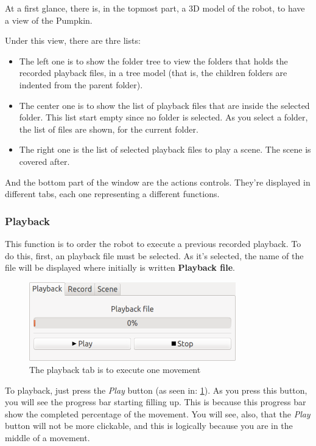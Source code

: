 \documentclass[oneside,a4paper,titlepage]{article}
\begin{document}
At a first glance, there is, in the topmost part, a 3D model of the robot, to have a view of the Pumpkin.

Under this view, there are thre lists:

\begin{itemize}
	\item The left one is to show the folder tree to view the folders that holds the recorded playback files, in a tree model (that is, the children folders are indented from the parent folder).

	\item The center one is to show the list of playback files that are inside the selected folder. This list start empty since no folder is selected. As you select a folder, the list of files are shown, for the current folder.
	
	\item The right one is the list of selected playback files to play a scene. The scene is covered after.
\end{itemize}

And the bottom part of the window are the actions controls. They're displayed in different tabs, each one representing a different functions.

\subsubsection{Playback}
\label{subsec:playback}
	This function is to order the robot to execute a previous recorded playback. To do this, first, an playback file must be selected. As it's selected, the name of the file will be displayed where initially is written \textbf{Playback file}.
	
	\begin{figure}[h]
		\centering
		\includegraphics[width=0.8\textwidth]{playback_tab}
		\caption[Playback Tab]{The playback tab is to execute one movement}
		\label{fig:playback_tab}
	\end{figure}
	
	To playback, just press the \emph{Play} button (as seen in: \ref{fig:playback_tab}). As you press this button, you will see the progress bar starting filling up. This is because this progress bar show the completed percentage of the movement. You will see, also, that the \emph{Play} button will not be more clickable, and this is logically because you are in the middle of a movement.
	
\end{document}
